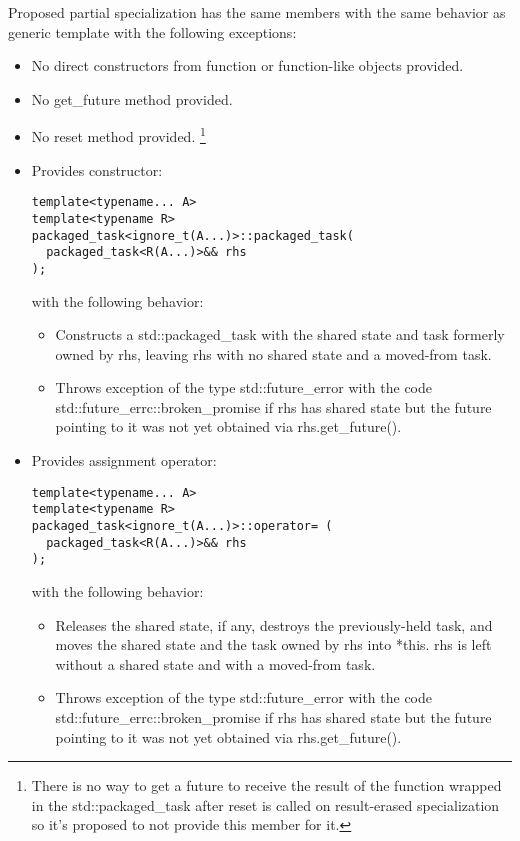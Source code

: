 \documentclass[ebook,openany,10pt,oneside,final]{memoir}
\begin{document}
Proposed partial specialization has the same members with the same behavior as
generic template with the following exceptions:
\begin{itemize}
 \item No direct constructors from function or function-like objects provided.
 \item No \mbox{get_future} method provided.
 \item No reset method provided. \footnote{There is no way to get a future to
receive the result of the function wrapped in the \mbox{std::packaged_task}
after reset is called on result-erased specialization so it's proposed to not
provide this member for it.}
 \item Provides constructor:
 \begin{lstlisting}
template<typename... A>
template<typename R>
packaged_task<ignore_t(A...)>::packaged_task(
  packaged_task<R(A...)>&& rhs
);
 \end{lstlisting}
 with the following behavior:
 \begin{itemize}
  \item Constructs a std::packaged_task with the shared state and task
formerly owned by rhs, leaving rhs with no shared state and a moved-from task.
  \item Throws exception of the type \mbox{std::future_error} with the code
\mbox{std::future_errc::broken_promise} if rhs has shared state but the future
pointing to it was not yet obtained via \mbox{rhs.get_future()}.
 \end{itemize}

 \item Provides assignment operator:
 \begin{lstlisting}
template<typename... A>
template<typename R>
packaged_task<ignore_t(A...)>::operator= (
  packaged_task<R(A...)>&& rhs
);
 \end{lstlisting}
 with the following behavior:
 \begin{itemize}
  \item Releases the shared state, if any, destroys the previously-held task,
and moves the shared state and the task owned by rhs into *this. rhs is left
without a shared state and with a moved-from task.
  \item Throws exception of the type \mbox{std::future_error} with the code
\mbox{std::future_errc::broken_promise} if rhs has shared state but the future
pointing to it was not yet obtained via \mbox{rhs.get_future()}.
 \end{itemize}
\end{itemize}
\end{document}
